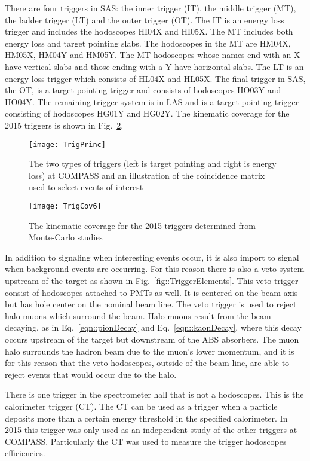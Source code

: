 There are four triggers in SAS: the inner trigger (IT), the middle trigger (MT),
the ladder trigger (LT) and the outer trigger (OT).  The IT is an energy loss
trigger and includes the hodoscopes HI04X and HI05X.  The MT includes both
energy loss and target pointing slabs.  The hodoscopes in the MT are HM04X,
HM05X, HM04Y and HM05Y.  The MT hodoscopes whose names end with an X have
vertical slabs and those ending with a Y have horizontal slabs.  The LT is an
energy loss trigger which consists of HL04X and HL05X.  The final trigger in
SAS, the OT, is a target pointing trigger and consists of hodoscopes HO03Y and
HO04Y.  The remaining trigger system is in LAS and is a target pointing trigger
consisting of hodoscopes HG01Y and HG02Y.  The kinematic coverage for the 2015
triggers is shown in Fig.~\ref{fig::TrigCov6}. \par

\begin{figure}[h!t]
  \centering
  \texttt{[image: TrigPrinc]}
  \caption{The two types of triggers (left is target pointing and right is
    energy loss) at COMPASS and an illustration of the coincidence matrix used
    to select events of interest}
  \label{fig::TrigPrinc}
\end{figure}

\begin{figure}[h!t]
  \centering
  \texttt{[image: TrigCov6]}
  \caption{The kinematic coverage for the 2015 triggers determined from
    Monte-Carlo studies}
  \label{fig::TrigCov6}
\end{figure}

In addition to signaling when interesting events occur, it is also import to
signal when background events are occurring.  For this reason there is also a
veto system upstream of the target as shown in Fig.~\ref{fig::TriggerElements}.
This veto trigger consist of hodoscopes attached to PMTs as well.  It is
centered on the beam axis but has hole center on the nominal beam line.  The
veto trigger is used to reject halo muons which surround the beam.  Halo muons
result from the beam decaying, as in Eq.~\ref{eqn::pionDecay} and
Eq.~\ref{eqn::kaonDecay}, where this decay occurs upstream of the target but
downstream of the ABS absorbers.  The muon halo surrounds the hadron beam due to
the muon's lower momentum, and it is for this reason that the veto hodoscopes,
outside of the beam line, are able to reject events that would occur due to the
halo.

There is one trigger in the spectrometer hall that is not a hodoscopes.  This is
the calorimeter trigger (CT).  The CT can be used as a trigger when a particle
deposits more than a certain energy threshold in the specified calorimeter.  In
2015 this trigger was only used as an independent study of the other triggers at
COMPASS. Particularly the CT was used to measure the trigger hodoscopes
efficiencies. \par


